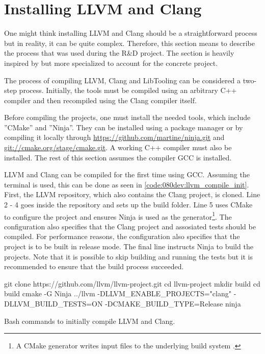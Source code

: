 \section{Installing LLVM and Clang}
One might think installing LLVM and Clang should be a straightforward process but in reality, it can be quite complex. Therefore, this section means to describe the process that was used during the R\&D project. The section is heavily inspired by \cite{clangTutorialBuildingTools} but more specialized to account for the concrete project.

The process of compiling LLVM, Clang and LibTooling can be considered a two-step process. Initially, the tools must be compiled using an arbitrary C++ compiler and then recompiled using the Clang compiler itself.

Before compiling the projects, one must install the needed tools, which include ''CMake'' and ''Ninja''. They can be installed using a package manager or by compiling it locally through \url{https://github.com/martine/ninja.git} and \url{git://cmake.org/stage/cmake.git}. A working C++ compiler must also be installed. The rest of this section assumes the compiler GCC is installed.


LLVM and Clang can be compiled for the first time using GCC. Assuming the terminal is used, this can be done as seen in \cref{code:080dev:llvm_compile_init}.
First, the LLVM repository, which also contains the Clang project, is cloned.
Line 2 - 4 goes inside the repository and sets up the build folder.
Line 5 uses CMake to configure the project and ensures Ninja is used as the generator\footnote{A CMake generator writes input files to the underlying build system \cite{cmakeCmakegeneratorsCMake26}.}. The configuration also specifies that the Clang project and assosiated tests should be compiled. For performance reasons, the configuration also specifies that the project is to be built in release mode. The final line instructs Ninja to build the projects. Note that it is possible to skip building and running the tests but it is recommended to ensure that the build process succeeded.

\begin{listing}[H]
    \begin{bashcode}
git clone https://github.com/llvm/llvm-project.git
cd llvm-project
mkdir build
cd build
cmake -G Ninja ../llvm -DLLVM_ENABLE_PROJECTS="clang" -DLLVM_BUILD_TESTS=ON -DCMAKE_BUILD_TYPE=Release
ninja
    \end{bashcode}
    \caption{Bash commands to initially compile LLVM and Clang.}
    \label{code:080dev:llvm_compile_init}
\end{listing}

